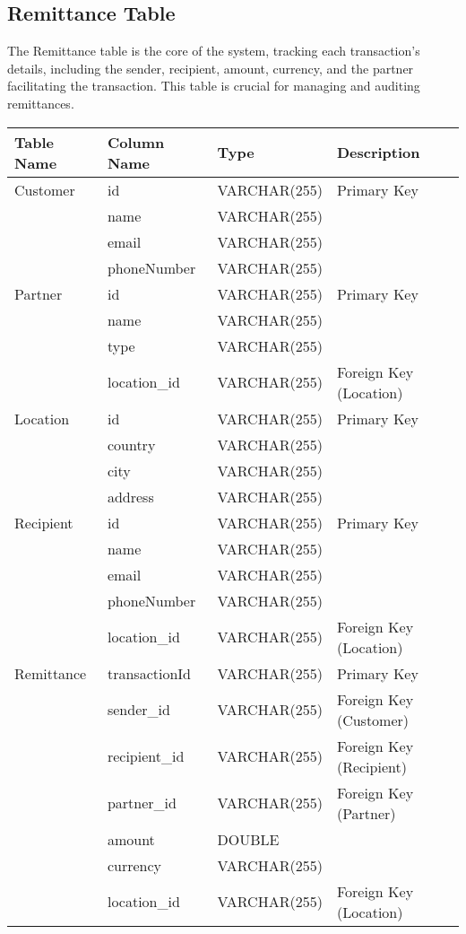 \documentclass[10pt,a4paper]{article}
\begin{document}
\subsection*{Remittance Table}
The Remittance table is the core of the system, tracking each transaction's details, including the sender, recipient, amount, currency, and the partner facilitating the transaction. This table is crucial for managing and auditing remittances.

\begin{longtable}{|l|l|l|l|}
\hline
\textbf{Table Name} & \textbf{Column Name} & \textbf{Type} & \textbf{Description} \\ \hline
\endhead

Customer & id & VARCHAR(255) & Primary Key \\ \cline{2-4} 
 & name & VARCHAR(255) &  \\ \cline{2-4} 
 & email & VARCHAR(255) &  \\ \cline{2-4} 
 & phoneNumber & VARCHAR(255) &  \\ \hline
 
Partner & id & VARCHAR(255) & Primary Key \\ \cline{2-4} 
 & name & VARCHAR(255) &  \\ \cline{2-4} 
 & type & VARCHAR(255) &  \\ \cline{2-4} 
 & location\_id & VARCHAR(255) & Foreign Key (Location) \\ \hline

Location & id & VARCHAR(255) & Primary Key \\ \cline{2-4} 
 & country & VARCHAR(255) &  \\ \cline{2-4} 
 & city & VARCHAR(255) &  \\ \cline{2-4} 
 & address & VARCHAR(255) &  \\ \hline

Recipient & id & VARCHAR(255) & Primary Key \\ \cline{2-4} 
 & name & VARCHAR(255) &  \\ \cline{2-4} 
 & email & VARCHAR(255) &  \\ \cline{2-4} 
 & phoneNumber & VARCHAR(255) &  \\ \cline{2-4} 
 & location\_id & VARCHAR(255) & Foreign Key (Location) \\ \hline
 
Remittance & transactionId & VARCHAR(255) & Primary Key \\ \cline{2-4} 
 & sender\_id & VARCHAR(255) & Foreign Key (Customer) \\ \cline{2-4} 
 & recipient\_id & VARCHAR(255) & Foreign Key (Recipient) \\ \cline{2-4} 
 & partner\_id & VARCHAR(255) & Foreign Key (Partner) \\ \cline{2-4} 
 & amount & DOUBLE &  \\ \cline{2-4} 
 & currency & VARCHAR(255) &  \\ \cline{2-4} 
 & location\_id & VARCHAR(255) & Foreign Key (Location) \\ \hline

\end{longtable}
\end{document}

